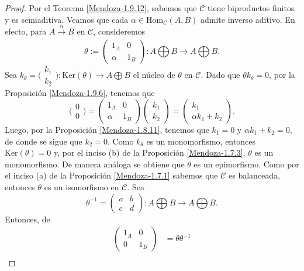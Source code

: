 \documentclass[tesis]{subfiles}
\begin{document}
\begin{proof}

    Por el Teorema \ref{Mendoza-1.9.12}, sabemos que $\mathscr{C}$ tiene biproductos finitos y es semiaditiva. Veamos que cada $\alpha\in\text{Hom}_\mathscr{C}(A,B)$ admite inverso aditivo. En efecto, para $A\xrightarrow[]{\alpha}B$ en $\mathscr{C}$, consideremos
    \[
        \theta:= \begin{pmatrix} 1_A &0 \\ \alpha &1_B \end{pmatrix}:A\bigoplus B\to A\bigoplus B.
    \] 
    Sea $k_\theta = \big( \begin{smallmatrix} k_1 \\ k_2 \end{smallmatrix} \big):\text{Ker}(\theta)\to A\bigoplus B$ el núcleo de $\theta$ en $\mathscr{C}$. Dado que $\theta k_\theta=0$, por la Proposición \ref{Mendoza-1.9.6}, tenemos que
    \[
        \big( \begin{smallmatrix} 0 \\ 0 \end{smallmatrix} \big) = \begin{pmatrix} 1_A &0 \\ \alpha &1_B \end{pmatrix} \begin{pmatrix} k_1 \\ k_2 \end{pmatrix} = \begin{pmatrix} k_1 \\ \alpha k_1 + k_2 \end{pmatrix}.
    \] 
    Luego, por la Proposición \ref{Mendoza-1.8.11}, tenemos que $k_1=0$ y $\alpha k_1+k_2 = 0$, de donde se sigue que $k_2=0$. Como $k_\theta$ es un monomorfismo, entonces $\text{Ker}(\theta) = 0$ y, por el inciso (b) de la Proposición \ref{Mendoza-1.7.3}, $\theta$ es un monomorfismo. De manera análoga se obtiene que $\theta$ es un epimorfismo. Como por el inciso (a) de la Proposición \ref{Mendoza-1.7.1} sabemos que $\mathscr{C}$ es balanceada, entonces $\theta$ es un isomorfismo en $\mathscr{C}$. Sea
    \[
        \theta^{-1} = \begin{pmatrix} a &b \\ c &d \end{pmatrix}:A\bigoplus B\to A\bigoplus B.
    \] 
    Entonces, de
    \begin{align*}
        \begin{pmatrix} 1_A &0 \\ 0 &1_B \end{pmatrix} &= \theta\theta^{-1} \\

\end{align*}
\end{proof}
\end{document}
